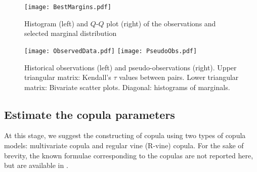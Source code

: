 \documentclass{llncs}
\begin{document}
\begin{figure} %
  \centering
  \texttt{[image: BestMargins.pdf]}%
  \caption{Histogram (left) and $Q$-$Q$ plot (right) of the observations and selected marginal distribution}
  \label{fig1}%
\end{figure}

\begin{figure} %
  \centering
  \texttt{[image: ObservedData.pdf]}
  \texttt{[image: PseudoObs.pdf]}
  \caption{Historical observations (left) and pseudo-observations (right). Upper  triangular  matrix:  Kendall’s $\tau$ values between pairs. Lower triangular matrix: Bivariate scatter plots. Diagonal: histograms of marginals.}
  \label{pairs}%
\end{figure}


\subsection{Estimate the copula parameters}


At this stage, we suggest the constructing of copula using two types of copula models: multivariate copula and regular vine (R-vine) copula. For the sake of brevity, the known formulae corresponding to the %
copulas are not reported here, but are available in \cite{Nelsen1999, Joe2014,Czado2010,Cooke2015}.
\end{document}
